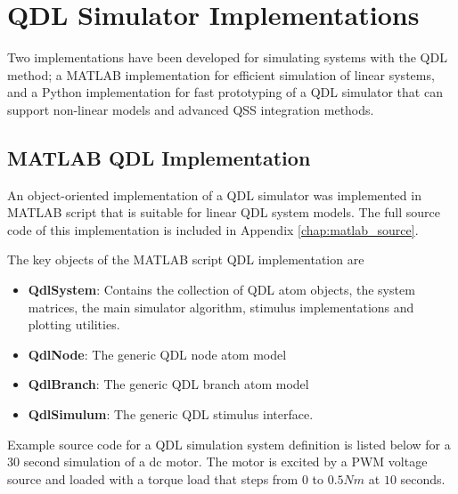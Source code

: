 
\chapter{QDL Simulator Implementations}\label{chap:simulator}

Two implementations have been developed for simulating systems with the QDL method; a MATLAB implementation for efficient simulation of linear systems, and a Python implementation for fast prototyping of a QDL simulator that can support non-linear models and advanced QSS integration methods. 

\section{MATLAB QDL Implementation} 

An object-oriented implementation of a QDL simulator was implemented in MATLAB script that is suitable for linear QDL system models. The full source code of this implementation is included in Appendix \ref{chap:matlab_source}. 

The key objects of the MATLAB script QDL implementation are

\begin{itemize}
    \item{\textbf{QdlSystem}: Contains the collection of QDL atom objects, the system matrices, the main simulator algorithm, stimulus implementations and plotting utilities.}
    \item{\textbf{QdlNode}: The generic QDL node atom model}
    \item{\textbf{QdlBranch}: The generic QDL branch atom model}
    \item{\textbf{QdlSimulum}: The generic QDL stimulus interface.}
\end{itemize}

Example source code for a QDL simulation system definition is listed below for a 30 second simulation of a dc motor. The motor is excited by a PWM voltage source and loaded with a  torque load that steps from $0$ to $0.5 Nm$ at $10$ seconds. 

\bigskip


